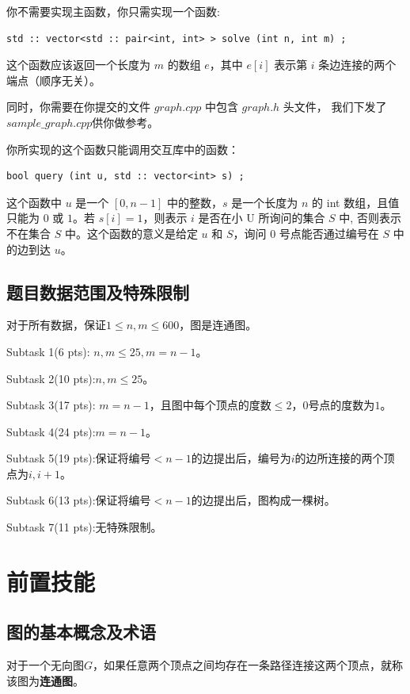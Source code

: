 \documentclass{noithesis}
\begin{document}
你不需要实现主函数，你只需实现一个函数:

\lstset{language=C}
\begin{lstlisting}
std :: vector<std :: pair<int, int> > solve (int n, int m) ;
\end{lstlisting}

这个函数应该返回一个长度为 $m$ 的数组 $e$，其中 $e[i]$ 表示第 $i$ 条边连接的两个端点（顺序无关）。

同时，你需要在你提交的文件 $graph.cpp$ 中包含 $graph.h$ 头文件，
我们下发了 $sample\_graph.cpp$供你做参考。

你所实现的这个函数只能调用交互库中的函数：

\lstset{language=C}
\begin{lstlisting}
bool query (int u, std :: vector<int> s) ;
\end{lstlisting}

这个函数中 $u$ 是一个 $[0, n - 1]$ 中的整数，$s$ 是一个长度为 $n$ 的 int 数组，且值只能为 $0$ 或 $1$。若
$s[i] = 1$，则表示 $i$ 是否在小 U 所询问的集合 $S$ 中, 否则表示不在集合 $S$ 中。这个函数的意义是给定 $u$ 和 $S$，询问 $0$ 号点能否通过编号在 $S$ 中的边到达 $u$。

\subsection{题目数据范围及特殊限制}

对于所有数据，保证$1 \leq n, m \leq 600$，图是连通图。

Subtask 1(6 pts): $n, m \leq 25, m = n - 1$。

Subtask 2(10 pts):$n, m \leq 25$。

Subtask 3(17 pts): $m = n - 1$，且图中每个顶点的度数$\leq 2$，$0$号点的度数为$1$。

Subtask 4(24 pts):$m = n - 1$。

Subtask 5(19 pts):保证将编号$< n - 1$的边提出后，编号为$i$的边所连接的两个顶点为$i, i + 1$。

Subtask 6(13 pts):保证将编号$<n - 1$的边提出后，图构成一棵树。

Subtask 7(11 pts):无特殊限制。

\section{前置技能}

\subsection{图的基本概念及术语}
对于一个无向图$G$，如果任意两个顶点之间均存在一条路径连接这两个顶点，就称该图为\textbf{连通图}。
\end{document}
